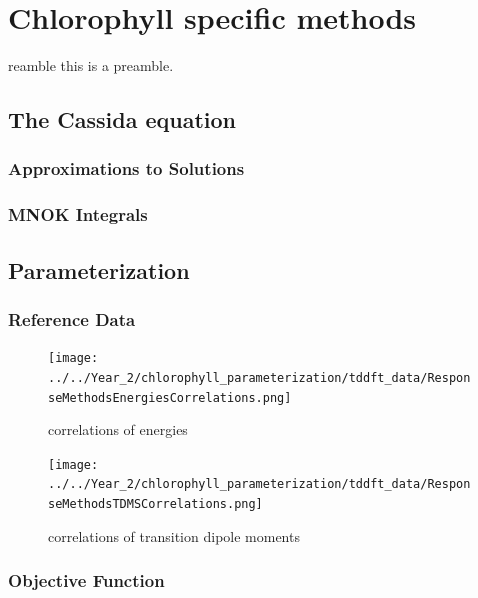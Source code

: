 %
%
\let\textcircled=\pgftextcircled
\chapter{Chlorophyll specific methods}
\label{chap:chl_xtb}

reamble this is a preamble.

\section{The Cassida equation}
\label{sec:cassida}

\subsection{Approximations to Solutions}
\label{subsec:chl_approxs}

\subsection{MNOK Integrals}
\label{subsec:MNOK}

\section{Parameterization}
\label{sec:chl_params}

\subsection{Reference Data}
\label{subsec:ref_data}

\begin{figure}
    \texttt{[image: ../../Year\_2/chlorophyll\_parameterization/tddft\_data/ResponseMethodsEnergiesCorrelations.png]}
    \caption{correlations of energies}
\end{figure}

\begin{figure}
    \texttt{[image: ../../Year\_2/chlorophyll\_parameterization/tddft\_data/ResponseMethodsTDMSCorrelations.png]}
    \caption{correlations of transition dipole moments}
\end{figure}


\subsection{Objective Function}
\label{subsec:obj_func}

